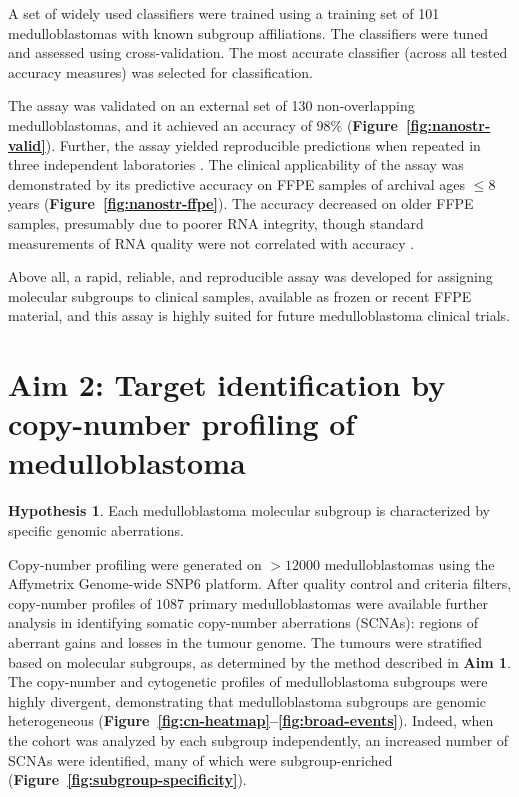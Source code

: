 \documentclass[11pt,letterpaper]{article}
\theoremstyle{definition}
\newtheorem*{hypothesis}{Hypothesis}
\begin{document}
A set of widely used classifiers were trained using a training set of 101 medulloblastomas with known subgroup affiliations. The classifiers were tuned and assessed using cross-validation. The most accurate classifier (across all tested accuracy measures) was selected for classification.

The assay was validated on an external set of 130 non-overlapping medulloblastomas, and it achieved an accuracy of 98\% (\textbf{Figure~\ref{fig:nanostr-valid}}). Further, the assay yielded reproducible predictions when repeated in three independent laboratories . The clinical applicability of the assay was demonstrated by its predictive accuracy on FFPE samples of archival ages $\leq 8$ years (\textbf{Figure~\ref{fig:nanostr-ffpe}}). The accuracy decreased on older FFPE samples, presumably due to poorer RNA integrity, though standard measurements of RNA quality were not correlated with accuracy .

Above all, a rapid, reliable, and reproducible assay was developed for assigning molecular subgroups to clinical samples, available as frozen or recent FFPE material, and this assay is highly suited for future medulloblastoma clinical trials.

\section{Aim 2: Target identification by copy-number profiling of medulloblastoma}

\begin{hypothesis}
Each medulloblastoma molecular subgroup is characterized by specific genomic aberrations.
\end{hypothesis}

Copy-number profiling were generated on $> 12000$ medulloblastomas using the Affymetrix Genome-wide SNP6 platform. After quality control and criteria filters, copy-number profiles of $1087$ primary medulloblastomas were available further analysis in identifying somatic copy-number aberrations (SCNAs): regions of aberrant gains and losses in the tumour genome. The tumours were stratified based on molecular subgroups, as determined by the method described in \textbf{Aim 1}. The copy-number and cytogenetic profiles of medulloblastoma subgroups were highly divergent, demonstrating that medulloblastoma subgroups are genomic heterogeneous (\textbf{Figure~\ref{fig:cn-heatmap}--\ref{fig:broad-events}}). Indeed, when the cohort was analyzed by each subgroup independently, an increased number of SCNAs were identified, many of which were subgroup-enriched (\textbf{Figure~\ref{fig:subgroup-specificity}}).
\end{document}
